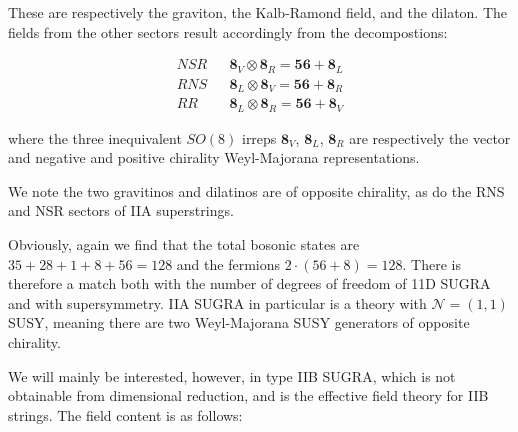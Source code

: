 These are respectively the graviton, the Kalb-Ramond field, and the dilaton. The fields from the other sectors result accordingly from the decompostions:

\begin{align}
	NSR && \mathbf{8}_V \otimes \mathbf{8}_R = \mathbf{56} + \mathbf{8}_L\\
	RNS && \mathbf{8}_L \otimes \mathbf{8}_V = \mathbf{56} + \mathbf{8}_R\\
	RR  && \mathbf{8}_L \otimes \mathbf{8}_R = \mathbf{56} + \mathbf{8}_V
	\label{}
\end{align}

where the three inequivalent $SO(8)$ irreps $\mathbf{8}_V$, $\mathbf{8}_L$, $\mathbf{8}_R$ are respectively the vector and negative and positive chirality Weyl-Majorana representations.

We note the two gravitinos and dilatinos are of opposite chirality, as do the RNS and NSR sectors of IIA superstrings. 


Obviously, again we find that the total bosonic states are $35+28+1+8+56 = 128$ and the fermions $2\cdot (56+8) = 128$. There is therefore a match both with the number of degrees of freedom of 11D SUGRA and with supersymmetry. IIA SUGRA in particular is a theory with $\mathcal{N}=(1,1)$ SUSY, meaning there are two Weyl-Majorana SUSY generators of opposite chirality.


We will mainly be interested, however, in type IIB SUGRA, which is not obtainable from dimensional reduction, and is the effective field theory for IIB strings. The field content is as follows:


